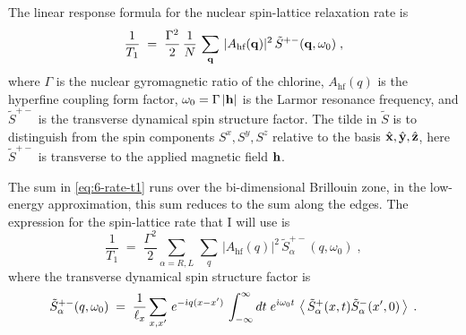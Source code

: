The linear response formula for the nuclear spin-lattice relaxation rate is\cite{Carretta2011,coleman2015}
\begin{equation}
    \frac{1}{T_1} \; = \; \frac{\Gamma^2}{2} \, \frac{1}{N}\, \sum_{\bf{q}} \, \vert A_{\text{hf}}(\bf{q}) \vert^2 \, \tilde{S}^{+-}( \bf{q},\omega_0) \; ,  \label{eq:6-rate-t1}
\end{equation}
where $\Gamma$ is the nuclear gyromagnetic ratio of the chlorine, $A_{\text{hf}}(q)$ is the hyperfine coupling form factor, $\omega_{0} = \Gamma\,  \vert \bf{h} \vert $ is the Larmor resonance frequency, and $\tilde{S}^{+-}$ is the transverse dynamical spin structure factor. The tilde in $\tilde{S}$ is to distinguish from the spin components $S^{x},S^{y},S^{z}$ relative to the basis $\hat{\bf{x}},\hat{\bf{y}},\hat{\bf{z}}$, here  $\tilde{S}^{+-}$ is transverse to the applied magnetic field $\bf{h}$.

The sum in \eqref{eq:6-rate-t1} runs over the bi-dimensional Brillouin zone, in the low-energy approximation, this sum reduces to the sum along the edges. The expression for the spin-lattice rate that I will use is
\begin{equation}
    \frac{1}{T_1} \; = \; \frac{\Gamma^2}{2} \sum_{\alpha = R,L} \, \sum_{q} \, \vert A_{\text{hf}}(q) \vert^2 \, \tilde{S}^{+-}_{\alpha}(q,\omega_0) \; , 
\end{equation}
where the transverse dynamical spin structure factor is 
\begin{equation}
    \tilde{S}^{+-}_{\alpha}(q,\omega_0) \; = \; \frac{1}{\ell_x}\sum_{x,x'} \, e^{-\im q (x-x')} \, \int_{-\infty}^{\infty} dt \; e^{\im \omega_0 t } \, \left\langle \,  \tilde{S}_{\alpha}^{+}(x,t) \tilde{S}_{\alpha}^{-}(x',0) \,    \right\rangle \;. \label{eq:6-spm}
\end{equation}



